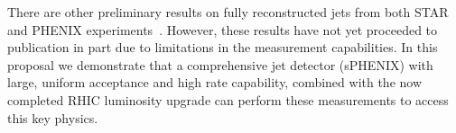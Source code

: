 
There are other preliminary results on fully reconstructed jets from
both STAR~\cite{Caines:2011ew,Putschke:2011zz,Putschke:2008wn,Jacobs:2010wq}
and PHENIX experiments~\cite{Lai:2011zzb,Lai:2009zq}.  However, these
results have not yet proceeded to publication in part due to limitations
in the measurement capabilities.  In this proposal we demonstrate that
a comprehensive jet detector (sPHENIX) with large, uniform acceptance
and high rate capability, combined with the now completed RHIC
luminosity upgrade can perform these measurements to access this key
physics.




